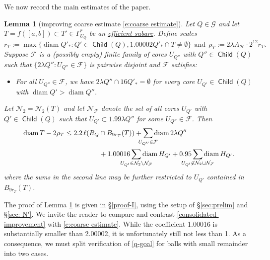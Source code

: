 \documentclass[12pt]{amsart}
\numberwithin{equation}{section}
\theoremstyle{plain}
\newtheorem{keylemma}{Lemma}
\theoremstyle{definition}
\newcommand{\diam}{\mathop\mathrm{diam}\nolimits}
\newcommand{\Child}{\mathop\mathsf{Child}\nolimits}
\numberwithin{figure}{section}
\begin{document}
We now record the main estimates of the paper.

\begin{keylemma}[improving coarse estimate \eqref{e:coarse estimate}] \label{improve} Let $Q\in\mathscr{G}$ and let $T=f([a,b])\subset T'\in\Gamma^*_{U_Q}$ be an \hyperref[def:subarc]{efficient subarc}. Define scales \begin{equation}\label{e:r_T def} r_{T}  := \max\{\diam Q'_*: Q'\in\Child(Q), 1.00002Q'_*\cap T\neq\emptyset\}\ \ \text{and}\ \  \rho_T  := 2\lambda A_\mathscr{H}\cdot 2^{12}r_T.\end{equation}
Suppose $\mathcal{F}$ is a (possibly empty) finite family of cores $U_{Q''}$ with $Q''\in\Child(Q)$ such that $\{2\lambda Q'':U_{Q''}\in\mathcal{F}\}$ is pairwise disjoint and $\mathcal{F}$ satisfies:  \begin{itemize}
\item[(F)] \label{property-F} For all $U_{Q''}\in\mathcal{F}$, we have $2\lambda Q'' \cap 16Q'_*=\emptyset$ for every core $U_{Q'}\in\Child(Q)$ with $\diam Q'>\diam Q''$.
\end{itemize} Let $\mathcal{N}_2=\mathcal{N}_2(T)$ and let $\mathcal{N}_\mathcal{F}$ denote the set of all cores $U_{Q'}$ with $Q'\in\Child(Q)$ such that $U_{Q'}\subset 1.99\lambda Q''$ for some $U_{Q''}\in\mathcal{F}$. Then
\begin{equation}\begin{split} \label{consolidated-improvement}
   \diam T-2\rho_T\leq 2.2\,\ell(R_Q&\cap B_{9r_T}(T)) + \sum_{\mathclap{U_{Q''}\in \mathcal{F}}} \diam 2\lambda Q'' \\ &+ 1.00016 \sum_{\mathclap{U_{Q'}\in \mathcal{N}_2\setminus\mathcal{N}_\mathcal{F}}}\diam H_{Q'} + 0.95 \sum_{\mathclap{U_{Q'}\not\in\mathcal{N}_2\cup\mathcal{N}_\mathcal{F}}} \diam H_{Q'}.
\end{split}\end{equation} where the sums in the second line may be further restricted to $U_{Q'}$ contained in $B_{9r_T}(T)$.
\end{keylemma}

The proof of Lemma \ref{improve} is given in \S\ref{proof-I}, using the setup of \S\ref{sec:prelim} and \S\ref{sec: N'}. We invite the reader to compare and contrast \eqref{consolidated-improvement} with \eqref{e:coarse estimate}.
While the coefficient 1.00016 is substantially smaller than 2.00002, it is unfortunately still not less than 1. As a consequence, we must split verification of \eqref{q-goal} for balls with small remainder into two cases.
\end{document}

